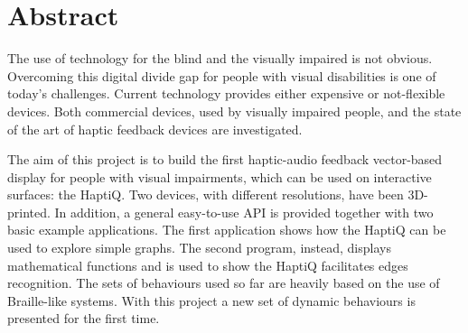 \section{Abstract}

The use of technology for the blind and the visually impaired is not obvious. Overcoming this digital divide gap for people with visual disabilities is one of today's challenges. Current technology provides either expensive or not-flexible devices. Both commercial devices, used by visually impaired people, and the state of the art of haptic feedback devices are investigated.

The aim of this project is to build the first haptic-audio feedback vector-based display for people with visual impairments, which can be used on interactive surfaces: the HaptiQ. Two devices, with different resolutions, have been 3D-printed. In addition, a general easy-to-use API is provided together with two basic example applications. The first application shows how the HaptiQ can be used to explore simple graphs. The second program, instead, displays mathematical functions and is used to show the HaptiQ facilitates edges recognition.
The sets of behaviours used so far are heavily based on the use of Braille-like systems. With this project a new set of dynamic behaviours is presented for the first time. 